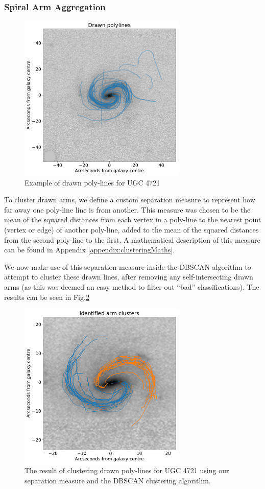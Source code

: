 \documentclass[../main.tex]{subfiles}
\begin{document}
\subsubsection{Spiral Arm Aggregation}
\begin{figure}
  \includegraphics[width=8cm]{images__results/drawn_polylines.pdf}
  \caption{Example of drawn poly-lines for UGC 4721}
  \label{fig:drawn_polylines}
\end{figure}

To cluster drawn arms, we define a custom separation measure to represent how far away one poly-line line is from another. This measure was chosen to be the mean of the squared distances from each vertex in a poly-line to the nearest point (vertex or edge) of another poly-line, added to the mean of the squared distances from the second poly-line to the first. A mathematical description of this measure can be found in Appendix \ref{appendix:clusteringMaths}.

We now make use of this separation measure inside the DBSCAN algorithm to attempt to cluster these drawn lines, after removing any self-intersecting drawn arms (as this was deemed an easy method to filter out ``bad'' classifications). The results can be seen in Fig.\ref{fig:arm_clusters}

\begin{figure}
  \includegraphics[width=8cm]{images__results/arm_clusters.pdf}
  \caption{The result of clustering drawn poly-lines for UGC 4721 using our separation measure and the DBSCAN clustering algorithm.}
  \label{fig:arm_clusters}
\end{figure}
\end{document}
